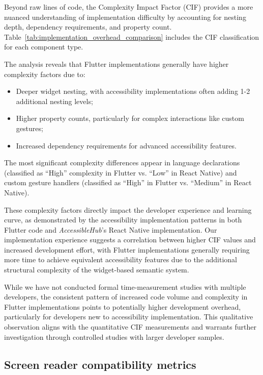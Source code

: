 Beyond raw lines of code, the Complexity Impact Factor (CIF) provides a more nuanced understanding of implementation difficulty by accounting for nesting depth, dependency requirements, and property count. Table~\ref{tab:implementation_overhead_comparison} includes the CIF classification for each component type.

The analysis reveals that Flutter implementations generally have higher complexity factors due to:

\begin{itemize}
    \item Deeper widget nesting, with accessibility implementations often adding 1-2 additional nesting levels;
    \item Higher property counts, particularly for complex interactions like custom gestures;
    \item Increased dependency requirements for advanced accessibility features.
\end{itemize}

The most significant complexity differences appear in language declarations (classified as ``High'' complexity in Flutter vs. ``Low'' in React Native) and custom gesture handlers (classified as ``High'' in Flutter vs. ``Medium'' in React Native).

These complexity factors directly impact the developer experience and learning curve, as demonstrated by the accessibility implementation patterns in both Flutter code and \textit{AccessibleHub}'s React Native implementation. Our implementation experience suggests a correlation between higher CIF values and increased development effort, with Flutter implementations generally requiring more time to achieve equivalent accessibility features due to the additional structural complexity of the widget-based semantic system.

While we have not conducted formal time-measurement studies with multiple developers, the consistent pattern of increased code volume and complexity in Flutter implementations points to potentially higher development overhead, particularly for developers new to accessibility implementation. This qualitative observation aligns with the quantitative CIF measurements and warrants further investigation through controlled studies with larger developer samples.

\subsection{Screen reader compatibility metrics}
\label{subsec:screen-reader-metrics}

